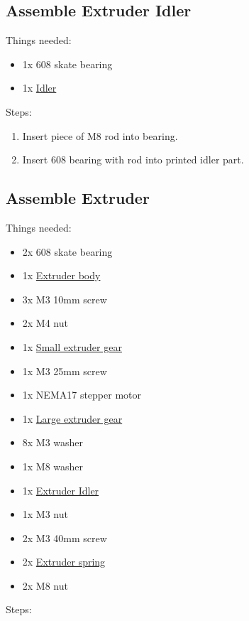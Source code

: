 \documentclass[11pt]{article}
\begin{document}
\subsection{Assemble Extruder Idler}
Things needed:
\begin{itemize}
\item 1x 608 skate bearing
\item 1x \hyperlink{thing_idler-m8-piece}{Idler}
\end{itemize}
Steps:
\begin{enumerate}
\item Insert piece of M8 rod into bearing.
\item Insert 608 bearing with rod into printed idler part.
\end{enumerate}

\subsection{Assemble Extruder}
Things needed:
\begin{itemize}
\item 2x 608 skate bearing
\item 1x \hyperlink{thing_extruder-body}{Extruder body}
\item 3x M3 10mm screw
\item 2x M4 nut
\item 1x \hyperlink{thing_small-gear}{Small extruder gear}
\item 1x M3 25mm screw
\item 1x NEMA17 stepper motor
\item 1x \hyperlink{thing_large-gear}{Large extruder gear}
\item 8x M3 washer
\item 1x M8 washer
\item 1x \hyperlink{thing_idler}{Extruder Idler}
\item 1x M3 nut
\item 2x M3 40mm screw
\item 2x \hyperlink{thing_extruder-spring}{Extruder spring}
\item 2x M8 nut
\end{itemize}
Steps:
\end{document}
